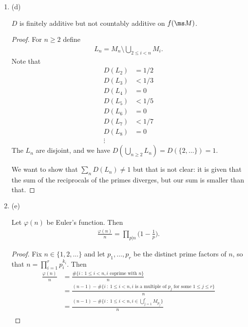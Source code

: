 \begin{enumerate}
\begin{enumerate}[label=(\alph*)]
  \item (d)
    \begin{claim*}
      $D$ is finitely additive but not countably additive on $f(\ms M)$.
    \end{claim*}
    \begin{proof}
      For $n \geq 2$ define
      \begin{align*}
        L_n = M_n \setminus \bigcup_{2 \leq i < n} M_i.
      \end{align*}
      Note that
      \begin{align*}
        D(L_2) &= 1/2 \\
        D(L_3) &< 1/3 \\
        D(L_4) &= 0 \\
        D(L_5) &< 1/5 \\
        D(L_6) &= 0 \\
        D(L_7) &< 1/7 \\
        D(L_8) &= 0 \\
        \vdots
      \end{align*}
      The $L_n$ are disjoint, and we have $D(\bigcup_{n \geq 2} L_n) = D(\{2, \ldots\}) = 1$.

      We want to show that $\sum_n D(L_n) \neq 1$ but that is not clear: it is given that the sum of the
      reciprocals of the primes diverges, but our sum is smaller than that.

    \end{proof}

  \item (e)
    \begin{claim*}
      Let $\varphi(n)$ be Euler's function. Then
      \begin{align*}
        \frac{\varphi(n)}{n} = \prod_{p|n}\big(1 - \frac{1}{p}\big).
      \end{align*}
    \end{claim*}
    \begin{proof}
      Fix $n \in \{1, 2, \ldots\}$ and let $p_1, \ldots, p_r$ be the distinct prime factors of $n$, so that $n = \prod_{i=1}^rp_i^{k_i}$.
      Then
      \begin{align*}
        \frac{\varphi(n)}{n} &= \frac{\#\big\{i ~:~ 1 \leq i < n, i \text{~coprime with~} n\big\}}{n} \\
                             &= \frac{(n - 1) - \#\big\{i ~:~ 1 \leq i < n, i \text{~is a multiple of~} p_j \text{~for some~} 1 \leq j \leq r\big\}}{n} \\
                             &= \frac{(n - 1) - \#\big\{i ~:~ 1 \leq i < n, i \in \bigcup_{j=1}^r M_{p_j}\big\}}{n} \\
      \end{align*}




\end{proof}
\end{enumerate}
\end{enumerate}
